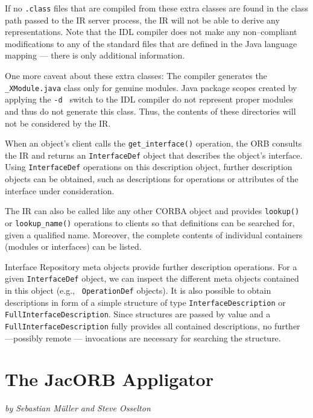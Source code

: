 \documentclass[12pt]{scrbook}
\begin{document}
If no  {\tt .class} files that  are compiled from  these extra classes
are found  in the class path passed  to the IR server  process, the IR
will not  be able  to derive any  representations.  Note that  the IDL
compiler does not make any non--compliant modifications to any of the
standard files that are defined in the Java language mapping --- there
is only additional information.

One more caveat about these  extra classes: The compiler generates the
{\tt  \_XModule.java} class  only  for genuine  modules. Java  package
scopes created by applying the {\tt -d } switch to the IDL compiler do
not  represent   proper  modules  and   thus  do  not   generate  this
class. Thus, the contents of  these directories will not be considered
by the IR.

When an  object's client  calls the {\tt  get\_interface()} operation,
the ORB consults the IR  and returns an {\tt InterfaceDef} object that
describes the object's  interface. Using {\tt InterfaceDef} operations
on  this  description  object,  further  description  objects  can  be
obtained,  such as descriptions  for operations  or attributes  of the
interface under consideration.

The IR  can also be  called like any  other CORBA object  and provides
{\tt lookup()}  or {\tt lookup\_name()} operations to  clients so that
definitions can be searched for, given a qualified name. Moreover, the
complete contents of individual containers (modules or interfaces) can
be listed.

Interface   Repository  meta   objects  provide   further  description
operations. For a given {\tt  InterfaceDef} object, we can inspect the
different  meta   objects  contained   in  this  object   (e.g.,  {\tt
OperationDef} objects). It is  also possible to obtain descriptions in
form of a simple structure  of type {\tt InterfaceDescription} or {\tt
FullInterfaceDescription}. Since structures are  passed by value and a
{\tt   FullInterfaceDescription}    fully   provides   all   contained
descriptions,  no  further  ---possibly  remote  ---  invocations  are
necessary for searching the structure.


\chapter{The JacORB Appligator}
\label{Ch_applets}

{\em by Sebastian M{\"u}ller and Steve Osselton}
\end{document}
